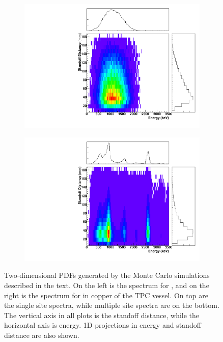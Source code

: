 \documentclass[herrin-thesis.tex]{subfiles}
\begin{document}
\begin{figure}[htp]
\begin{subfigure}[b]{0.48\textwidth}
	\end{subfigure}
	\begin{subfigure}[b]{0.48\textwidth}
	\centering
	\includegraphics[width=\textwidth]{./plots/PDFs/analysis_pdf_bb2n_ms.pdf}
	\end{subfigure}\hfill%
	\begin{subfigure}[b]{0.48\textwidth}
	\centering
	\includegraphics[width=\textwidth]{./plots/PDFs/analysis_pdf_AllVessel_Th232_ms.pdf}
	\end{subfigure}
\caption[Examples of 2D PDFs]{Two-dimensional PDFs generated by the Monte Carlo simulations described in the text. On the left is the spectrum for \twonu{}, and on the right is the spectrum for  in copper of the TPC vessel. On top are the single site spectra, while multiple site spectra are on the bottom. The vertical axis in all plots is the standoff distance, while the horizontal axis is energy. 1D projections in energy and standoff distance are also shown.}
\label{fig:analysis_example_PDFs}
\end{figure}
\end{document}

